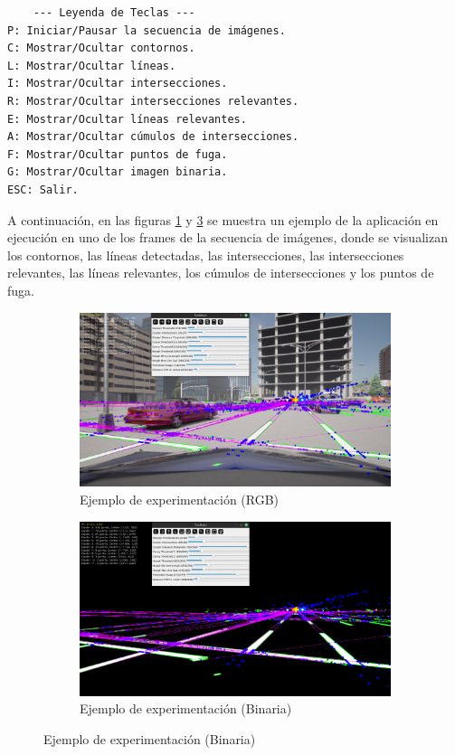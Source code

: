 \begin{verbatim}
    --- Leyenda de Teclas ---
P: Iniciar/Pausar la secuencia de imágenes.
C: Mostrar/Ocultar contornos.
L: Mostrar/Ocultar líneas.
I: Mostrar/Ocultar intersecciones.
R: Mostrar/Ocultar intersecciones relevantes.
E: Mostrar/Ocultar líneas relevantes.
A: Mostrar/Ocultar cúmulos de intersecciones.
F: Mostrar/Ocultar puntos de fuga.
G: Mostrar/Ocultar imagen binaria.
ESC: Salir.
\end{verbatim}
\noindent
A continuación, en las figuras \ref{fig:experimentationRgb} y \ref{fig:experimentationBinary} se muestra un ejemplo de la aplicación
en ejecución en uno de los frames de la secuencia de imágenes,
donde se visualizan los contornos, las líneas detectadas, las intersecciones, las intersecciones relevantes, las líneas relevantes,
los cúmulos de intersecciones y los puntos de fuga.

\begin{figure}[!ht]
    \begin{subfigure}{0.99\textwidth}
        \includegraphics[width=\textwidth]{img/reticule/experimentationRgb}
        \caption{Ejemplo de experimentación (RGB)}
        \label{fig:experimentationRgb}
    \end{subfigure}
    \begin{subfigure}{0.99\textwidth}
        \includegraphics[width=\textwidth]{img/reticule/experimentationBinary}
        \caption{Ejemplo de experimentación (Binaria)}
        \label{fig:experimentationBinary}
    \end{subfigure}
\end{figure}

